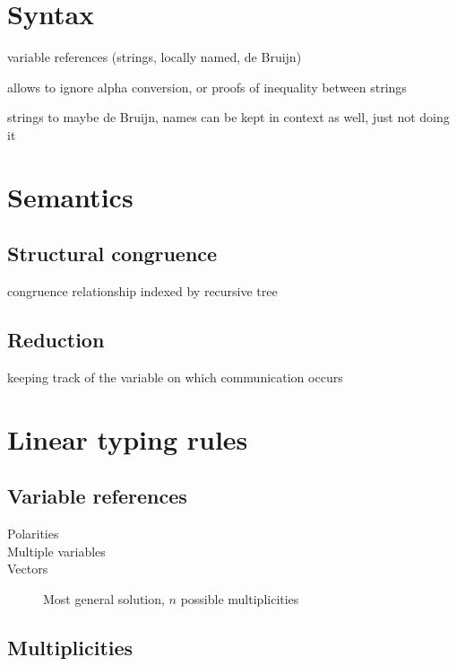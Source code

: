 \documentclass[a4paper,UKenglish,cleveref, autoref, thm-restate,authorcolumns]{lipics-v2019}
\begin{document}
\cite{typing-with-leftovers}

\section{Syntax}

variable references (strings, locally named, de Bruijn)

allows to ignore alpha conversion, or proofs of inequality between strings

strings to maybe de Bruijn, names can be kept in context as well, just not doing it

\section{Semantics}

\subsection{Structural congruence}

congruence relationship indexed by recursive tree

\subsection{Reduction}

keeping track of the variable on which communication occurs


\section{Linear typing rules}

\subsection{Variable references}

\begin{description}
  \item[Polarities]
  \item[Multiple variables]
  \item[Vectors]
    Most general solution, $n$ possible multiplicities
\end{description}

\subsection{Multiplicities}
\end{document}
